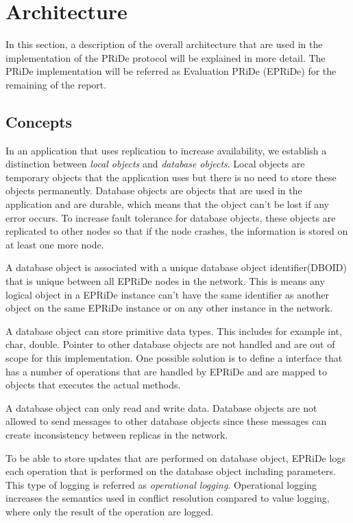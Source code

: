 
\section{Architecture} %
\label{sec:arch}

In this section, a description of the overall architecture that are used in the implementation of the PRiDe protocol will be explained in more detail. The PRiDe implementation will be referred as Evaluation PRiDe (EPRiDe) for the remaining of the report.  


\subsection{Concepts} %
\label{sub:consepts}

In an application that uses replication to increase availability, we establish a distinction between \emph{local objects} and \emph{database objects}. Local objects are temporary objects that the application uses but there is no need to store these objects permanently. Database objects are objects that are used in the application and are durable, which means that the object can't be lost if any error occurs. To increase fault tolerance for database objects, these objects are replicated to other nodes so that if the node crashes, the information is stored on at least one more node. 

A database object is associated with a unique database object identifier(DBOID) that is unique between all EPRiDe nodes in the network. This is means any logical object in a EPRiDe instance can't have the same identifier as another object on the same EPRiDe instance or on any other instance in the network.    

A database object can store primitive data types. This includes for example int, char, double. Pointer to other database objects are not handled and are out of scope for this implementation. One possible solution is to define a interface that has a number of operations that are handled by EPRiDe and are mapped to objects that executes the actual methods.  

A database object can only read and write data. Database objects are not allowed to send messages to other database objects since these messages can create inconsistency between replicas in the network.

To be able to store updates that are performed on database object, EPRiDe logs each operation that is performed on the database object including parameters. This type of logging is referred as \emph{operational logging}. Operational logging increases the semantics used in conflict resolution compared to value logging, where only the result of the operation are logged. 

